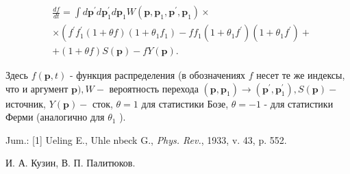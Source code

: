 \documentclass[10pt]{article}
\begin{document}
\[

\begin{aligned}

& \frac{d f}{d t}=\int d \boldsymbol{p}^{\prime} d \boldsymbol{p}_{1}^{\prime} d \boldsymbol{p}_{1} W\left(\boldsymbol{p}, \boldsymbol{p}_{1}, \boldsymbol{p}^{\prime}, \boldsymbol{p}_{1}\right) \times \\

& \times\left(f^{\prime} f_{1}^{\prime}(1+\theta f)\left(1+\theta_{1} f_{1}\right)-f f_{1}\left(1+\theta_{1} f^{\prime}\right)\left(1+\theta_{1} f^{\prime}\right)+\right. \\

& +(1+\theta f) S(\boldsymbol{p})-f Y(\boldsymbol{p}) \text {. }

\end{aligned}

\]



Здесь $f(\boldsymbol{p}, t)$ - функция распределения (в обозначениях $f$ несет те же индексы, что и аргумент $\boldsymbol{p}), W-$ вероятность перехода $\left(\boldsymbol{p}, \boldsymbol{p}_{1}\right) \rightarrow\left(\boldsymbol{p}^{\prime}, \boldsymbol{p}_{1}^{\prime}\right), S(\boldsymbol{p})-$ источник, $Y(\boldsymbol{p})-$ сток, $\theta=1$ для статистики Бозе, $\theta=-1$ - для статистики Ферми (аналогично для $\theta_{1}$ ).



Jum.: [1] Ueling E., Uhle nbeck G., \textit{Phys. Rev.}, 1933, v. 43, p. 552.



И. А. Кузин, В. П. Палитюков.
\end{document}
